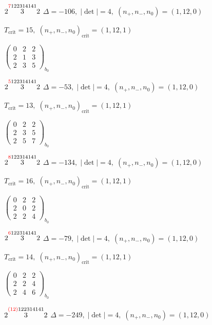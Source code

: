 \documentclass[10pt]{article}
\begin{document}
$2\overset{\textcolor{red}{7}122314141}{3}2$ \quad $\Delta=-106,\; |\det|=4,\; (n_+,n_-,n_0)=(1,12,0)$

\hspace{1em}$T_{\text{crit}}=15,\; (n_+,n_-,n_0)_{\text{crit}}=(1,12,1)$

\hspace{2em}$\left(\begin{smallmatrix}0 & 2 & 2 \\ 2 & 1 & 3 \\ 2 & 3 & 5\end{smallmatrix}\right)_{\!b_0}$

$2\overset{\textcolor{red}{5}122314141}{3}2$ \quad $\Delta=-53,\; |\det|=4,\; (n_+,n_-,n_0)=(1,12,0)$

\hspace{1em}$T_{\text{crit}}=13,\; (n_+,n_-,n_0)_{\text{crit}}=(1,12,1)$

\hspace{2em}$\left(\begin{smallmatrix}0 & 2 & 2 \\ 2 & 3 & 5 \\ 2 & 5 & 7\end{smallmatrix}\right)_{\!b_0}$

$2\overset{\textcolor{red}{8}122314141}{3}2$ \quad $\Delta=-134,\; |\det|=4,\; (n_+,n_-,n_0)=(1,12,0)$

\hspace{1em}$T_{\text{crit}}=16,\; (n_+,n_-,n_0)_{\text{crit}}=(1,12,1)$

\hspace{2em}$\left(\begin{smallmatrix}0 & 2 & 2 \\ 2 & 0 & 2 \\ 2 & 2 & 4\end{smallmatrix}\right)_{\!b_0}$

$2\overset{\textcolor{red}{6}122314141}{3}2$ \quad $\Delta=-79,\; |\det|=4,\; (n_+,n_-,n_0)=(1,12,0)$

\hspace{1em}$T_{\text{crit}}=14,\; (n_+,n_-,n_0)_{\text{crit}}=(1,12,1)$

\hspace{2em}$\left(\begin{smallmatrix}0 & 2 & 2 \\ 2 & 2 & 4 \\ 2 & 4 & 6\end{smallmatrix}\right)_{\!b_0}$

$2\overset{\textcolor{red}{(12)}122314141}{3}2$ \quad $\Delta=-249,\; |\det|=4,\; (n_+,n_-,n_0)=(1,12,0)$
\end{document}
